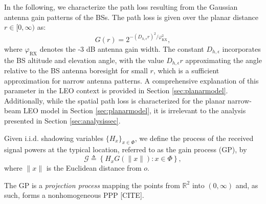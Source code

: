 \documentclass[lettersize,journal]{IEEEtran}
\begin{document}
In the following, we characterize the path loss resulting from the Gaussian antenna gain patterns of the BSs. The path loss is given over the planar distance $r \in [0, \infty)$ as:
  \begin{equation}
    \label{eq:Gaussianantpat}
    G(r) = 2^{-(D_{h,\epsilon}r)^2 / \varphi_{\text{RX}}^2},
  \end{equation}
  where $\varphi_{\text{RX}}$ denotes the -3 dB antenna gain width. The constant $D_{h,\epsilon}$ incorporates the BS altitude and elevation angle, with the value $D_{h,\epsilon}r$ approximating the angle relative to the BS antenna boresight for small $r$, which is a sufficient approximation for narrow antenna patterns. A comprehensive explanation of this parameter in the LEO context is provided in Section \ref{sec:planarmodel}. Additionally, while the spatial path loss is characterized for the planar narrow-beam LEO model in Section \ref{sec:planarmodel}, it is irrelevant to the analysis presented in Section \ref{sec:analysissec}.




Given i.i.d. shadowing variables $\{H_x\}_{x \in \Phi}$, we define the process of the received signal powers at the typical location, referred to as the gain process (GP), by
\begin{equation}
  \label{eq:gainprocess}
  \mathcal{G} \triangleq \left\{ H_x G(\|x\|) : x \in \Phi \right\},
\end{equation}
where $\|x\|$ is the Euclidean distance from $\textit{o}$. 

The GP is a \textit{projection process} mapping the points from $\mathbb{R}^2$ into $(0,\infty)$ and, as such, forms a nonhomogeneous PPP [CITE].
\end{document}
